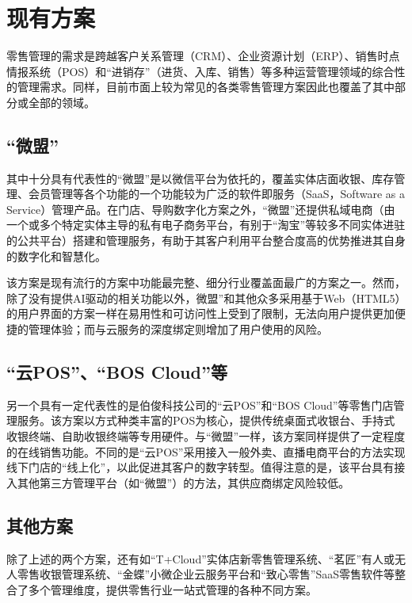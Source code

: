 \newpage
\section{现有方案}
\label{sec:prior_art}

零售管理的需求是跨越客户关系管理（CRM）、企业资源计划（ERP）、销售时点情报系统（POS）和“进销存”（进货、入库、销售）等多种运营管理领域\cite{tao2006erp-crm}的综合性的管理需求。同样，目前市面上较为常见的各类零售管理方案因此也覆盖了其中部分或全部的领域。

\subsection{“微盟”}

其中十分具有代表性的“微盟”是以微信平台为依托的，覆盖实体店面收银、库存管理、会员管理等各个功能的一个功能较为广泛的软件即服务（SaaS，Software as a Service）管理产品。在门店、导购数字化方案之外，“微盟”还提供私域电商\cite{qi2020private_ecommence}（由一个或多个特定实体主导的私有电子商务平台，有别于“淘宝”等较多不同实体进驻的公共平台）搭建和管理服务，有助于其客户利用平台整合度高的优势推进其自身的数字化和智慧化。

该方案是现有流行的方案中功能最完整、细分行业覆盖面最广的方案之一。然而，除了没有提供AI驱动的相关功能以外，微盟”和其他众多采用基于Web（HTML5）的用户界面的方案一样在易用性和可访问性上受到了限制，无法向用户提供更加便捷的管理体验；而与云服务的深度绑定则增加了用户使用的风险。

\subsection{“云POS”、“BOS Cloud”等}

另一个具有一定代表性的是伯俊科技公司的“云POS”和“BOS Cloud”等零售门店管理服务。该方案以方式种类丰富的POS为核心，提供传统桌面式收银台、手持式收银终端、自助收银终端等专用硬件。与“微盟”一样，该方案同样提供了一定程度的在线销售功能。不同的是“云POS”采用接入一般外卖、直播电商平台的方法实现线下门店的“线上化”，以此促进其客户的数字转型。值得注意的是，该平台具有接入其他第三方管理平台（如“微盟”）的方法，其供应商绑定风险较低。

\subsection{其他方案}

除了上述的两个方案，还有如“T+Cloud”实体店新零售管理系统、“茗匠”有人或无人零售收银管理系统、“金蝶”小微企业云服务平台和“致心零售”SaaS零售软件等整合了多个管理维度，提供零售行业一站式管理的各种不同方案。

